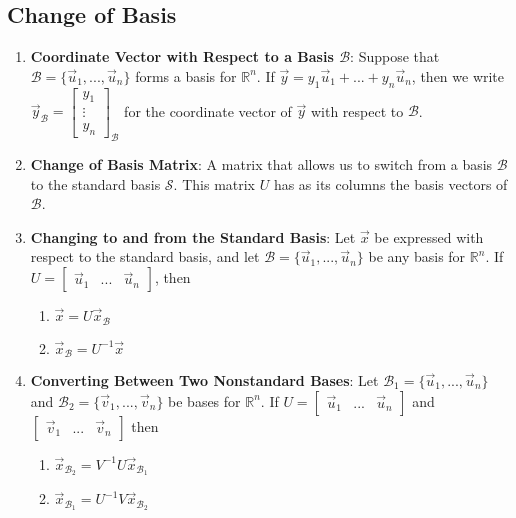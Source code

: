 \documentclass[10pt]{article}
\begin{document}
\subsection{Change of Basis}
\begin{enumerate}
\item \textbf{Coordinate Vector with Respect to a Basis $\mathcal{B}$}: Suppose that $\mathcal{B}= \lbrace \vec{u}_1,...,\vec{u}_n \rbrace$ forms a basis for $\mathbb{R}^n$. If $\vec{y} = y_1\vec{u}_1 + ... + y_n\vec{u}_n$, then we write $\vec{y}_\mathcal{B} = \begin{bmatrix}
y_1 \\ \vdots \\ y_n
\end{bmatrix}_\mathcal{B}$ for the coordinate vector of $\vec{y}$ with respect to $\mathcal{B}$.
\item \textbf{Change of Basis Matrix}: A matrix that allows us to switch from a basis $\mathcal{B}$ to the standard basis $\mathcal{S}$. This matrix $U$ has as its columns the basis vectors of $\mathcal{B}$.
\item \textbf{Changing to and from the Standard Basis}: Let $\vec{x}$ be expressed with respect to the standard basis, and let $\mathcal{B}= \lbrace \vec{u}_1,...,\vec{u}_n \rbrace$ be any basis for $\mathbb{R}^n$. If $U = \begin{bmatrix}
\vec{u}_1 & ... & \vec{u}_n
\end{bmatrix}$, then 
\begin{enumerate}
\item $\vec{x} = U\vec{x}_\mathcal{B}$
\item $\vec{x}_\mathcal{B} = U^{-1}\vec{x}$
\end{enumerate}
\item \textbf{Converting Between Two Nonstandard Bases}: Let $\mathcal{B}_1 = \lbrace \vec{u}_1,...,\vec{u}_n \rbrace$ and $\mathcal{B}_2 = \lbrace \vec{v}_1,...,\vec{v}_n \rbrace$ be bases for $\mathbb{R}^n$. If $U = \begin{bmatrix}
\vec{u}_1 & ... & \vec{u}_n
\end{bmatrix}$ and $\begin{bmatrix}
\vec{v}_1 & ... & \vec{v}_n
\end{bmatrix}$ then
\begin{enumerate}
\item $\vec{x}_{\mathcal{B}_2} = V^{-1}U\vec{x}_{\mathcal{B}_1}$
\item $\vec{x}_{\mathcal{B}_1} = U^{-1}V\vec{x}_{\mathcal{B}_2}$
\end{enumerate}

\end{enumerate}
\end{document}
